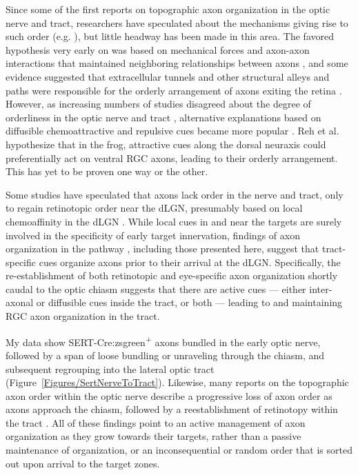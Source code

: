 Since some of the first reports on topographic axon organization in the optic nerve and tract, researchers have speculated about the mechanisms giving rise to such order (e.g. ), but little headway has been made in this area.
The favored hypothesis very early on was based on mechanical forces and axon-axon interactions that maintained neighboring relationships between axons \cite{cook1977multiple}, and some evidence suggested that extracellular tunnels and other structural alleys and paths were responsible for the orderly arrangement of axons exiting the retina \cite{silver1980mechanism}.
However, as increasing numbers of studies disagreed about the degree of orderliness in the optic nerve and tract \cite{martin1983role}, alternative explanations based on diffusible chemoattractive and repulsive cues became more popular \cite{reh1983organization}.
Reh et al.  hypothesize that in the frog, attractive cues along the dorsal neuraxis could preferentially act on ventral RGC axons, leading to their orderly arrangement.
This has yet to be proven one way or the other.

Some studies have speculated that axons lack order in the nerve and tract, only to regain retinotopic order near the dLGN, presumably based on local chemoaffinity in the dLGN \cite{horton1979non}.
While local cues in and near the targets are surely involved in the specificity of early target innervation, findings of axon organization in the pathway \cite{martin1983role,reese1993reestablishment,chan1994changes,chan1999changes,plas2005pretarget}, including those presented here, suggest that tract-specific cues organize axons prior to their arrival at the dLGN.
Specifically, the re-establishment of both retinotopic and eye-specific axon organization shortly caudal to the optic chiasm suggests that there are active cues --- either inter-axonal or diffusible cues inside the tract, or both --- leading to and maintaining RGC axon organization in the tract.

My data show SERT-Cre:zsgreen\textsuperscript{+} axons bundled in the early optic nerve, followed by a span of loose bundling or unraveling through the chiasm, and subsequent regrouping into the lateral optic tract (Figure~\ref{Figures/SertNerveToTract}).
Likewise, many reports on the topographic axon order within the optic nerve describe a progressive loss of axon order as axons approach the chiasm, followed by a reestablishment of retinotopy within the tract \cite{horton1979non,ehrlich1984course,naito1986course,simon1991relationship,reese1993reestablishment,chan1994changes,naito1994retinogeniculate,colello1998changing,montgomery1998organization,chan1999changes,plas2005pretarget}.
All of these findings point to an active management of axon organization as they grow towards their targets, rather than a passive maintenance of organization, or an inconsequential or random order that is sorted out upon arrival to the target zones.

